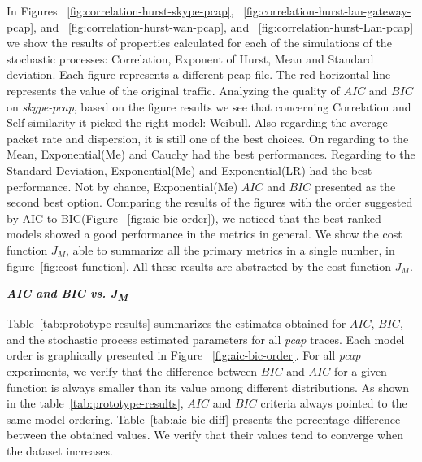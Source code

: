 In Figures ~\ref{fig:correlation-hurst-skype-pcap}, ~\ref{fig:correlation-hurst-lan-gateway-pcap}, and ~\ref{fig:correlation-hurst-wan-pcap}, and  ~\ref{fig:correlation-hurst-Lan-pcap} we show the results of properties calculated for each of the simulations of the stochastic processes: Correlation, Exponent of Hurst, Mean and Standard deviation. Each figure represents a different pcap file. The red horizontal line represents the value of the original traffic. Analyzing the quality of $AIC$ and $BIC$ on \textit{skype-pcap}, based on the figure results we see that concerning Correlation and Self-similarity it picked the right model: Weibull. Also regarding the average packet rate and dispersion, it is still one of the best choices. On regarding to the Mean, Exponential(Me) and Cauchy had the best performances. Regarding to the Standard Deviation, Exponential(Me) and Exponential(LR) had the best performance. Not by chance, Exponential(Me) $AIC$ and $BIC$ presented as the second best option. Comparing the results of the figures with the order suggested by AIC to BIC(Figure ~\ref{fig:aic-bic-order}), we noticed that the best ranked models showed a good performance in the metrics in general. We show the cost function $J_M$, able to summarize all the primary metrics in a single number, in figure~\ref{fig:cost-function}. All these results are abstracted by the cost function $J_M$. 


\smallskip \noindent  \textbf{\textit{AIC and BIC vs. J\textsubscript{M} }} 

Table~\ref{tab:prototype-results} summarizes the estimates obtained  for $AIC$, $BIC$, and the stochastic process estimated parameters for all \textit{pcap} traces. Each model order is graphically presented in Figure ~\ref{fig:aic-bic-order}.  For all \textit{pcap} experiments, we verify that the difference between $BIC$ and $AIC$ for a given function is always smaller than its value among different distributions. As shown in the table~\ref{tab:prototype-results}, $AIC$ and $BIC$ criteria always pointed to the same model ordering. Table~\ref{tab:aic-bic-diff} presents the percentage difference between the obtained values. We verify that their values tend to converge when the dataset increases. 

